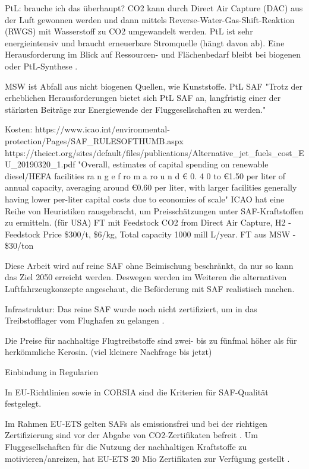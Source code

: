 PtL: brauche ich das überhaupt?
CO2 kann durch Direct Air Capture (DAC) aus der Luft gewonnen werden und dann mittels 
Reverse-Water-Gas-Shift-Reaktion (RWGS) mit Wasserstoff zu CO2 umgewandelt werden. 
PtL ist sehr energieintensiv und braucht erneuerbare Stromquelle (hängt davon ab).
\cite{ansell2023review}
Eine Herausforderung im Blick auf Ressourcen- und Flächenbedarf bleibt bei biogenen oder PtL-Synthese \cite{ansell2023review}.

MSW ist Abfall aus nicht biogenen Quellen, wie Kunststoffe. \cite{icao_saf_conversion_2024} PtL SAF "Trotz der erheblichen Herausforderungen 
bietet sich PtL SAF an, langfristig einer der stärksten Beiträge zur Energiewende der Fluggesellschaften zu werden."

Kosten:
https://www.icao.int/environmental-protection/Pages/SAF_RULESOFTHUMB.aspx
https://theicct.org/sites/default/files/publications/Alternative_jet_fuels_cost_EU_20190320_1.pdf
"Overall, estimates of capital spending
on renewable diesel/HEFA facilities
ra n g e f ro m a ro u n d € 0. 4 0 to
€1.50 per liter of annual capacity,
averaging around €0.60 per liter,
with larger facilities generally having
lower per-liter capital costs due to
economies of scale"
ICAO hat eine Reihe von Heuristiken rausgebracht, um Preisschätzungen unter SAF-Kraftstoffen zu ermitteln. (für USA)
FT mit Feedstock CO2 from Direct Air Capture, H2 - Feedstock Price \$300/t, \$6/kg, Total capacity 1000 mill L/year.
FT aus MSW - \$30/ton 

Diese Arbeit wird auf reine SAF ohne Beimischung beschränkt, da nur so kann das Ziel 2050 erreicht werden. 
Deswegen werden im Weiteren die alternativen Luftfahrzeugkonzepte angeschaut, die Beförderung mit SAF realistisch machen.


Infrastruktur: Das reine SAF wurde noch nicht zertifiziert, um in das Treibstofflager vom Flughafen zu gelangen \cite{iata_saf_2024}.


Die Preise für nachhaltige Flugtreibstoffe sind zwei- bis zu fünfmal höher als für herkömmliche Kerosin. (viel kleinere Nachfrage bis jetzt)

Einbindung in Regularien

In EU-Richtlinien sowie in CORSIA sind die Kriterien für SAF-Qualität festgelegt.

Im Rahmen EU-ETS gelten SAFs als emissionsfrei und bei der richtigen Zertifizierung sind vor der Abgabe von CO2-Zertifikaten 
befreit \cite{icao_saf_conversion_2024}. Um Fluggesellschaften für die Nutzung der nachhaltigen Kraftstoffe zu motivieren/anreizen, hat EU-ETS
20 Mio Zertifikaten zur Verfügung gestellt \cite{icao_saf_conversion_2024}.

